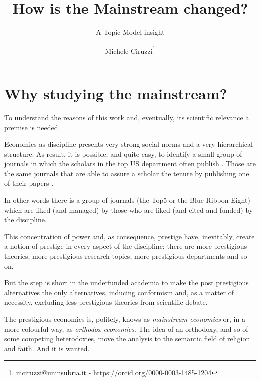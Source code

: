 \documentclass[a4paper, headings=standardclasses]{scrartcl}
\title{How is the Mainstream changed? \let\thefootnote\relax\footnotetext{This version is intended to be submitted to the XV ESHET Conference}}
\subtitle{A Topic Model insight}
\author{Michele Ciruzzi\thanks{mciruzzi@uninsubria.it - https://orcid.org/0000-0003-1485-1204}}
\begin{document}
\maketitle


\section{Why studying the mainstream?}
To understand the reasons of this work and, eventually, its scientific relevance a premise is needed.

Economics as discipline presents very strong social norms and a very hierarchical structure.
As result, it is possible, and quite easy, to identify a small group of journals in which the scholars in the top US department often publish \parencite{card2013,kim2006,kim2009,dusansky1998,hamermesh2013,ellison2003,heck2006}.
Those are the same journals that are able to assure a scholar the tenure by publishing one of their papers \parencite{heckman2020}.

In other words there is a group of journals (the Top5 or the Blue Ribbon Eight) which are liked (and managed) by those who are liked (and cited and funded) by the discipline.

This concentration of power and, as consequence, prestige have, inevitably, create a notion of prestige in every aspect of the discipline: there are more prestigious theories, more prestigious research topics, more prestigious departments and so on.

But the step is short in the underfunded academia to make the post prestigious alternatives the only alternatives, inducing conformism and, as a matter of necessity, excluding less prestigious theories from scientific debate.

The prestigious economics is, politely, knows as \textit{mainstream economics} or, in a more colourful way, as \textit{orthodox economics}. The idea of an orthodoxy, and so of some competing heterodoxies, move the analysis to the semantic field of religion and faith. And it is wanted.
\end{document}
